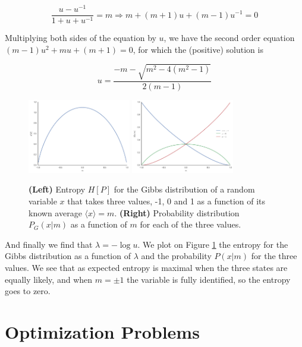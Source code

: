 \begin{equation}
   \frac{u - u^{-1}}{1 + u + u^{-1}} = m \Rightarrow 
   m + (m+1)u + (m -1) u^{-1} = 0
\end{equation}

Multiplying both sides of the equation by $u$, we have the second order equation $(m - 1) u^2 + m u + (m + 1) = 0$, for which the (positive) solution is

\begin{equation}
   u = \frac{-m - \sqrt{m^2 - 4(m^2 - 1)}}{2 (m - 1)}
\end{equation}

\begin{figure}[!ht]
  \centering
  \includegraphics[width=0.4\textwidth]{figs_statmech/fig1a.png}
  \includegraphics[width=0.4\textwidth]{figs_statmech/fig1b.png}
  \caption{\textbf{(Left)} Entropy $H[P]$ for the Gibbs distribution of a random variable $x$ that takes three values, -1, 0 and 1 as a function of its known average $\langle x \rangle = m$. \textbf{(Right)} Probability distribution $P_G(x|m)$ as a function of $m$ for each of the three values.}
  \label{fig:simple_example}
\end{figure}

And finally we find that $\lambda = -\log u$. We plot on Figure \ref{fig:simple_example} the entropy for the Gibbs distribution as a function of $\lambda$ and the probability $P(x|m)$ for the three values. We see that as expected entropy is maximal when the three states are equally likely, and when $m = \pm 1$ the variable is fully identified, so the entropy goes to zero.


\section{Optimization Problems}

